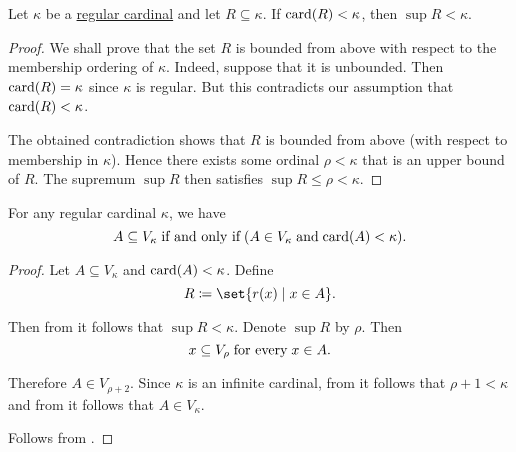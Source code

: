 \begin{lemma}\label{thm:regular_cardinal_stage_supremum_lemma}
  Let \( \kappa \) be a \hyperref[def:regular_cardinal]{regular cardinal} and let \( R \subseteq \kappa \). If \( \operatorname{card}(R) < \kappa \), then \( \sup R < \kappa \).
\end{lemma}
\begin{proof}
  We shall prove that the set \( R \) is bounded from above with respect to the membership ordering of \( \kappa \). Indeed, suppose that it is unbounded. Then \( \operatorname{card}(R) = \kappa \) since \( \kappa \) is regular. But this contradicts our assumption that \( \operatorname{card}(R) < \kappa \).

  The obtained contradiction shows that \( R \) is bounded from above (with respect to membership in \( \kappa \)). Hence there exists some ordinal \( \rho < \kappa \) that is an upper bound of \( R \). The supremum \( \sup R \) then satisfies \( \sup R \leq \rho < \kappa \).
\end{proof}

\begin{proposition}\label{thm:regular_cardinal_stage_inverse_transitivity}
  For any regular cardinal \( \kappa \), we have
  \begin{equation*}
    A \subseteq V_\kappa \T{if and only if} (A \in V_\kappa \T{and} \card(A) < \kappa).
  \end{equation*}
\end{proposition}
\begin{proof}
  \SufficiencySubProof Let \( A \subseteq V_\kappa \) and \( \operatorname{card}(A) < \kappa \). Define
  \begin{equation*}
    R \coloneqq \set{ r(x) \given x \in A }.
  \end{equation*}

  Then from  it follows that \( \sup R < \kappa \). Denote \( \sup R \) by \( \rho \). Then
  \begin{equation*}
    x \subseteq V_\rho \T{for every} x \in A.
  \end{equation*}

  Therefore \( A \in V_{\rho + 2} \). Since \( \kappa \) is an infinite cardinal, from  it follows that \( \rho + 1 < \kappa \) and from  it follows that \( A \in V_\kappa \).

  \NecessitySubProof Follows from .
\end{proof}

